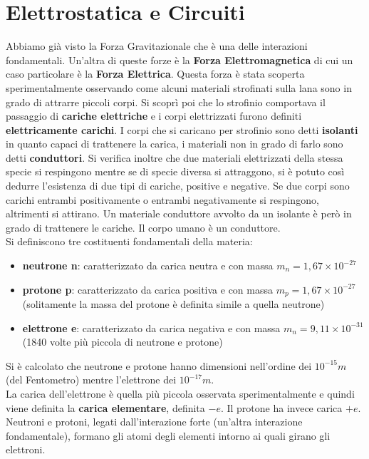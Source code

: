 \documentclass[a4paper,12pt, oneside]{book}
\begin{document}
\chapter{Elettrostatica e Circuiti}
Abbiamo già visto la Forza Gravitazionale che è una delle interazioni fondamentali. Un'altra di queste forze è la\textbf{ Forza Elettromagnetica} di cui un caso particolare è la \textbf{Forza Elettrica}. Questa forza è stata scoperta sperimentalmente osservando come alcuni materiali strofinati sulla lana sono in grado di attrarre piccoli corpi. Si scoprì poi che lo strofinio comportava il passaggio di \textbf{cariche elettriche} e i corpi elettrizzati furono definiti  \textbf{elettricamente carichi}. I corpi che si caricano per strofinio sono detti \textbf{isolanti} in quanto capaci di trattenere la carica, i materiali non in grado di farlo sono detti \textbf{conduttori}. Si verifica inoltre che due materiali elettrizzati della stessa specie si respingono mentre se di specie diversa si attraggono, si è potuto così dedurre l'esistenza di due tipi di cariche, positive e negative. Se due corpi sono carichi entrambi positivamente o entrambi negativamente si respingono, altrimenti si attirano. Un materiale conduttore avvolto da un isolante è però in grado di trattenere le cariche. Il corpo umano è un conduttore.\\
Si definiscono tre costituenti fondamentali della materia:
\begin{itemize}
\item \textbf{neutrone n}: caratterizzato da carica neutra e con massa $m_n=1,67\times 10^{-27}$
\item \textbf{protone p}: caratterizzato da carica positiva e con massa $m_p=1,67\times 10^{-27}$ (solitamente la massa del protone è definita simile a quella neutrone)
\item \textbf{elettrone e}: caratterizzato da carica negativa e con massa $m_n=9,11\times 10^{-31}$ (1840 volte più piccola di neutrone e protone)
\end{itemize}
Si è calcolato che neutrone e protone hanno dimensioni nell'ordine dei $10^{-15}m$ (del Fentometro) mentre l'elettrone  dei $10^{-17}m$.\\
La carica dell'elettrone è quella più piccola osservata sperimentalmente e quindi viene definita la \textbf{carica elementare}, definita $-e$. Il protone ha invece carica $+e$. Neutroni e protoni, legati dall'interazione forte (un'altra interazione fondamentale), formano gli atomi degli elementi intorno ai quali girano gli elettroni.\\
\end{document}
